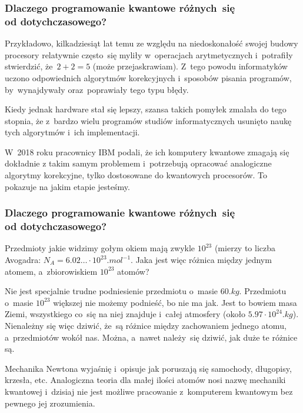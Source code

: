 \documentclass[10pt,t]{beamer}
\begin{document}
\begin{frame}
  \frametitle{Dlaczego programowanie kwantowe różnych~się \\
    od dotychczasowego?}


  Przykładowo, kilkadziesiąt lat temu ze względu na niedoskonałość
  swojej budowy procesory relatywnie często~się myliły w~operacjach
  arytmetycznych i~potrafiły stwierdzić, że~$2 + 2 = 5$ (może
  przejaskrawiam). Z~tego powodu informatyków uczono odpowiednich
  algorytmów korekcyjnych i~sposobów pisania programów, by~wynajdywały
  oraz~poprawiały tego typu błędy.

  Kiedy jednak hardware stał się lepszy, szansa takich pomyłek zmalała
  do tego stopnia, że z~bardzo wielu %
  programów studiów informatycznych usunięto naukę tych algorytmów
  i~ich implementacji.

  W~2018 roku pracownicy IBM podali, że ich komputery kwantowe zmagają
  się dokładnie z takim samym problemem i~potrzebują opracować
  analogiczne algorytmy korekcyjne, tylko dostosowane do kwantowych
  procesorów. To pokazuje na jakim etapie jesteśmy.

\end{frame}





\begin{frame}
  \frametitle{Dlaczego programowanie kwantowe różnych~się \\
    od dotychczasowego?}


  Przedmioty jakie widzimy gołym okiem mają zwykle $10^{ 23 }$ (mierzy
  to liczba Avogadra:
  $N_{ A } = 6.02\ldots \cdot 10^{ 23 } \si{.mol}^{ -1 }$. Jaka jest więc
  różnica między jednym atomem, a~zbiorowiskiem $10^{ 23 }$ atomów?

  Nie jest specjalnie trudne podniesienie przedmiotu o~masie
  $60 \si{.kg}$. Przedmiotu o~masie $10^{ 23 }$ większej nie możemy
  podnieść, bo nie ma jak. Jest to bowiem masa Ziemi, wszystkiego
  co~się na niej znajduje i~całej atmosfery (około
  $5.97 \cdot 10^{ 24 } \si{.kg}$). Nienależny się więc dziwić, że~są
  różnice między zachowaniem jednego atomu, a~przedmiotów wokół nas.
  Można, a~nawet należy~się dziwić, jak duże te różnice są.

  Mechanika Newtona wyjaśnię i~opisuje jak poruszają się samochody,
  długopisy, krzesła, etc. Analogiczna teoria dla małej ilości atomów
  nosi nazwę mechaniki kwantowej i~dzisiaj nie jest możliwe pracowanie
  z~komputerem kwantowym bez pewnego jej zrozumienia.

\end{frame}
\end{document}
